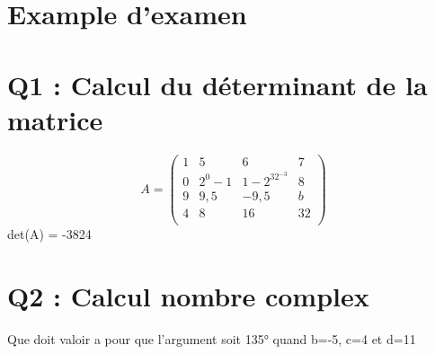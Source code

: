 

\newpage
\section{Example d'examen}
\section*{Q1 : Calcul du déterminant de la matrice}

$$
A =
\begin{pmatrix}
  1 & 5 & 6 & 7 \\
  0 & 2^0-1 & 1-2 ^32^{-3} & 8 \\
  9 & 9,5 & -9,5 & b \\
  4 & 8 & 16 & 32 \\
\end{pmatrix}
$$
 det(A) = -3824

\section*{Q2 : Calcul nombre complex}

Que doit valoir a pour que l’argument soit 135° quand b=-5, c=4 et d=11 \\

